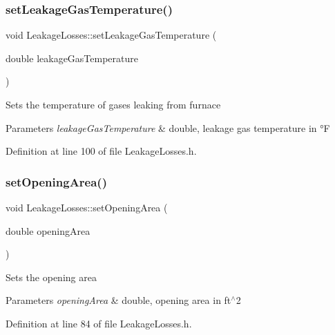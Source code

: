 \subsubsection{\texorpdfstring{set\+Leakage\+Gas\+Temperature()}{setLeakageGasTemperature()}}
{\footnotesize\ttfamily void Leakage\+Losses\+::set\+Leakage\+Gas\+Temperature (\begin{DoxyParamCaption}\item[{double}]{leakage\+Gas\+Temperature }\end{DoxyParamCaption})\hspace{0.3cm}{\ttfamily [inline]}}

Sets the temperature of gases leaking from furnace 
\begin{DoxyParams}{Parameters}
{\em leakage\+Gas\+Temperature} & double, leakage gas temperature in °F \\
\hline
\end{DoxyParams}


Definition at line 100 of file Leakage\+Losses.\+h.

\mbox{\label{class_leakage_losses_a417c9914af6b283695bdbd5e92451f9e}} 
\subsubsection{\texorpdfstring{set\+Opening\+Area()}{setOpeningArea()}}
{\footnotesize\ttfamily void Leakage\+Losses\+::set\+Opening\+Area (\begin{DoxyParamCaption}\item[{double}]{opening\+Area }\end{DoxyParamCaption})\hspace{0.3cm}{\ttfamily [inline]}}

Sets the opening area 
\begin{DoxyParams}{Parameters}
{\em opening\+Area} & double, opening area in ft$^\wedge$2 \\
\hline
\end{DoxyParams}


Definition at line 84 of file Leakage\+Losses.\+h.

\mbox{\label{class_leakage_losses_ab017828413655c5903374564e8718fac}} 
